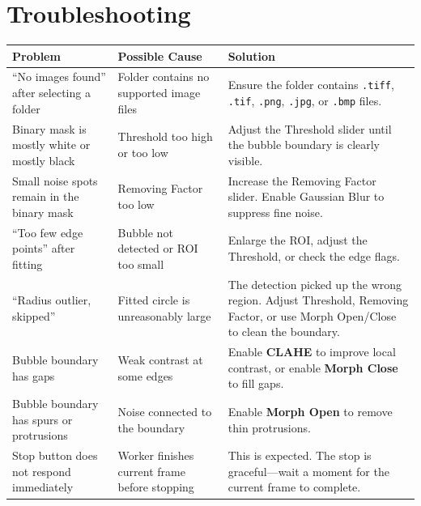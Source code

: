 \documentclass[11pt, letterpaper]{article}
\begin{document}
\section{Troubleshooting}

\begin{center}
\renewcommand{\arraystretch}{1.4}
\begin{tabular}{p{4.5cm}p{4cm}p{5cm}}
    \toprule
    \textbf{Problem} & \textbf{Possible Cause} & \textbf{Solution} \\
    \midrule

    ``No images found'' after selecting a folder &
    Folder contains no supported image files &
    Ensure the folder contains \texttt{.tiff}, \texttt{.tif}, \texttt{.png},
    \texttt{.jpg}, or \texttt{.bmp} files. \\

    Binary mask is mostly white or mostly black &
    Threshold too high or too low &
    Adjust the Threshold slider until the bubble boundary is clearly
    visible. \\

    Small noise spots remain in the binary mask &
    Removing Factor too low &
    Increase the Removing Factor slider. Enable Gaussian Blur to suppress
    fine noise. \\

    ``Too few edge points'' after fitting &
    Bubble not detected or ROI too small &
    Enlarge the ROI, adjust the Threshold, or check the edge flags. \\

    ``Radius outlier, skipped'' &
    Fitted circle is unreasonably large &
    The detection picked up the wrong region. Adjust Threshold, Removing
    Factor, or use Morph Open/Close to clean the boundary. \\

    Bubble boundary has gaps &
    Weak contrast at some edges &
    Enable \textbf{CLAHE} to improve local contrast, or enable
    \textbf{Morph Close} to fill gaps. \\

    Bubble boundary has spurs or protrusions &
    Noise connected to the boundary &
    Enable \textbf{Morph Open} to remove thin protrusions. \\

    Stop button does not respond immediately &
    Worker finishes current frame before stopping &
    This is expected. The stop is graceful---wait a moment for the
    current frame to complete. \\


\end{tabular}
\end{center}
\end{document}
